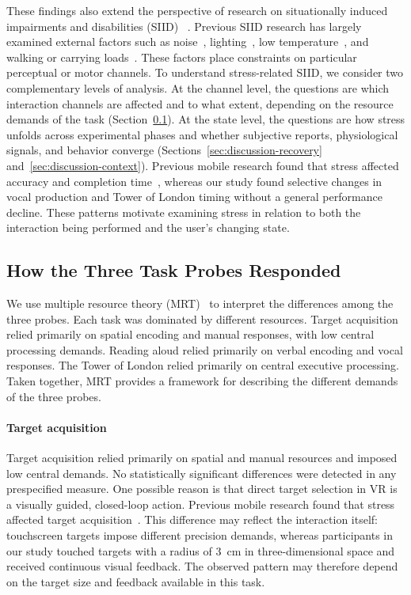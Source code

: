 These findings also extend the perspective of research on situationally induced impairments and disabilities (SIID) ~\citep{sears2003computers,sarsenbayeva2019situationally}. Previous SIID research has largely examined external factors such as noise~\citep{sarsenbayeva2018effect,li2025noise}, lighting~\citep{sarsenbayeva2019effect,liu2025understanding}, low temperature~\citep{goncalves2017tapping}, and walking or carrying loads~\citep{li2025estimating}. These factors place constraints on particular perceptual or motor channels. To understand stress-related SIID, we consider two complementary levels of analysis. At the channel level, the questions are which interaction channels are affected and to what extent, depending on the resource demands of the task (Section~\ref{sec:discussion-probes}). At the state level, the questions are how stress unfolds across experimental phases and whether subjective reports, physiological signals, and behavior converge (Sections~\ref{sec:discussion-recovery} and~\ref{sec:discussion-context}). Previous mobile research found that stress affected accuracy and completion time~\citep{sarsenbayeva2019measuring}, whereas our study found selective changes in vocal production and Tower of London timing without a general performance decline. These patterns motivate examining stress in relation to both the interaction being performed and the user's changing state.



\subsection{How the Three Task Probes Responded}
\label{sec:discussion-probes}

We use multiple resource theory (MRT)~\citep{wickens2008multiple} to interpret the differences among the three probes. Each task was dominated by different resources. Target acquisition relied primarily on spatial encoding and manual responses, with low central processing demands. Reading aloud relied primarily on verbal encoding and vocal responses. The Tower of London relied primarily on central executive processing. Taken together, MRT provides a framework for describing the different demands of the three probes.

\paragraph{Target acquisition}

Target acquisition relied primarily on spatial and manual resources and imposed low central demands. No statistically significant differences were detected in any prespecified measure. One possible reason is that direct target selection in VR is a visually guided, closed-loop action. Previous mobile research found that stress affected target acquisition~\citep{sarsenbayeva2019measuring}. This difference may reflect the interaction itself: touchscreen targets impose different precision demands, whereas participants in our study touched targets with a radius of 3~cm in three-dimensional space and received continuous visual feedback. The observed pattern may therefore depend on the target size and feedback available in this task.

